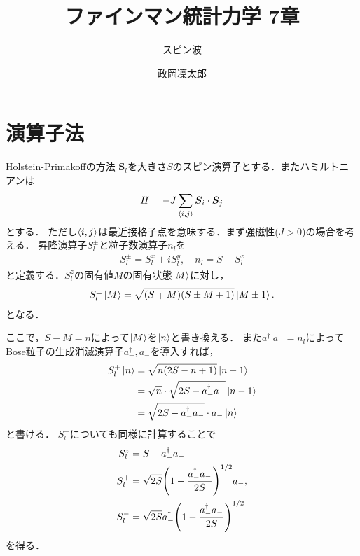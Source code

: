 \documentclass[dvipdfmx,9pt]{beamer}
\numberwithin{equation}{section}
\begin{document}
\title{ファインマン統計力学 7章}
\subtitle{スピン波}
\author{政岡凜太郎}
\frame{\titlepage}

\section{演算子法}
\begin{frame}{Holstein-Primakoffの方法}
    $\bm{S}_l$を大きさ$S$のスピン演算子とする．またハミルトニアンは
    \begin{align}
        H = -J \sum_{\expval{i,j}} \bm{S}_i \cdot \bm{S}_j
    \end{align}
    とする．
    ただし$\expval{i,j}$は最近接格子点を意味する．まず強磁性($J>0$)の場合を考える．
    昇降演算子$S_l^{\pm}$と粒子数演算子$n_l$を
    \begin{align}
        S_l^{\pm} = S_l^x \pm iS_l^y,
        \quad
        n_l = S - S_l^z
    \end{align}
    と定義する．$S_l^z$の固有値$M$の固有状態$\ket{M}$に対し，
    \begin{align}
        S_l^{\pm}\ket{M} = \sqrt{(S \mp M)(S \pm M + 1)}\ket{M \pm 1}.
    \end{align}
    となる．
\end{frame}
\begin{frame}
    ここで，$S-M = n$によって$\ket{M}$を$\ket{n}$と書き換える．
    また$a_-^\dagger a_- = n_l$によってBose粒子の生成消滅演算子$a_-^\dagger, a_-$を導入すれば，
    \begin{align*}
        S_l^+ \ket{n} &
        = \sqrt{n(2S-n+1)}\ket{n-1} 
        \\ &
        = \sqrt{n}\cdot\sqrt{2S-a_-^\dagger a_-}\ket{n-1}
        \\ &
        = \sqrt{2S-a_-^\dagger a_-}\cdot a_- \ket{n}
    \end{align*}
    と書ける．
    $S_l^-$についても同様に計算することで
    \begin{align}
        S_l^z &= S - a_-^\dagger a_-
        \label{HP method: def n}
        \\
        S_l^+ &= \sqrt{2S} \qty(1-\frac{a_-^\dagger a_-}{2S})^{1/2}a_-,
        \\
        S_l^- &= \sqrt{2S}a_-^\dagger \qty(1-\frac{a_-^\dagger a_-}{2S})^{1/2}
        \label{HP method: def a and a^dagger}
    \end{align}
    を得る．
\end{frame}
\end{document}
